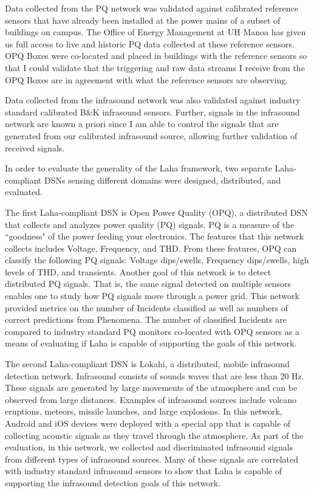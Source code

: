 Data collected from the PQ network was validated against calibrated reference sensors that have already been installed at the power mains of a subset of buildings on campus. The Office of Energy Management at UH Manoa has given us full access to live and historic PQ data collected at these reference sensors. OPQ Boxes were co-located and placed in buildings with the reference sensors so that I could validate that the triggering and raw data streams I receive from the OPQ Boxes are in agreement with what the reference sensors are observing.

Data collected from the infrasound network was also validated against industry standard calibrated B\&K infrasound sensors. Further, signals in the infrasound network are known a priori since I am able to control the signals that are generated from our calibrated infrasound source, allowing further validation of received signals.

In order to evaluate the generality of the Laha framework, two separate Laha-compliant DSNs sensing different domains were designed, distributed, and evaluated.

The first Laha-compliant DSN is Open Power Quality (OPQ), a distributed DSN that collects and analyzes power quality (PQ) signals. PQ is a measure of the ``goodness" of the power feeding your electronics. The features that this network collects includes Voltage, Frequency, and THD. From these features, OPQ can classify the following PQ signals: Voltage dips/swells, Frequency dips/swells, high levels of THD, and transients. Another goal of this network is to detect distributed PQ signals. That is, the same signal detected on multiple sensors enables one to study how PQ signals move through a power grid. This network provided metrics on the number of Incidents classified as well as numbers of correct predictions from Phenomena. The number of classified Incidents are compared to industry standard PQ monitors co-located with OPQ sensors as a means of evaluating if Laha is capable of supporting the goals of this network.

The second Laha-compliant DSN is Lokahi, a distributed, mobile infrasound detection network. Infrasound consists of sounds waves that are less than 20 Hz. These signals are generated by large movements of the atmosphere and can be observed from large distances. Examples of infrasound sources include volcano eruptions, meteors, missile launches, and large explosions. In this network, Android and iOS devices were deployed with a special app that is capable of collecting acoustic signals as they travel through the atmosphere. As part of the evaluation, in this network, we collected and discriminated infrasound signals from different types of infrasound sources. Many of these signals are correlated with industry standard infrasound sensors to show that Laha is capable of supporting the infrasound detection goals of this network.


